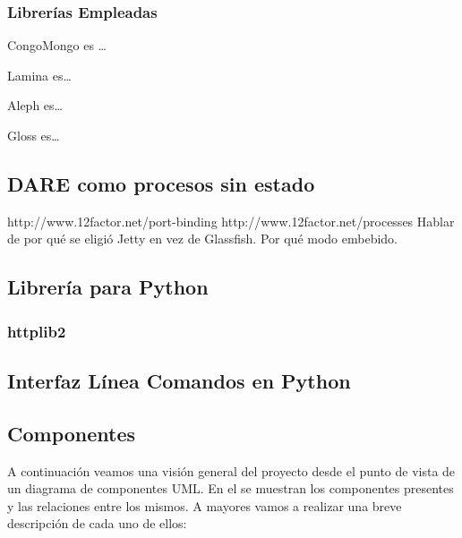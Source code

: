 \subsubsection{Librerías Empleadas}
\begin{description}
\item{CongoMongo} es \ldots{}
\item{Lamina} es\ldots{}
\item{Aleph} es\ldots{}
\item{Gloss} es\ldots{}
\end{description}

\subsection{DARE como procesos sin estado}
http://www.12factor.net/port-binding
http://www.12factor.net/processes
Hablar de por qué se eligió Jetty en vez de Glassfish. Por qué modo
embebido.

\subsection{Librería para Python}
\subsubsection{httplib2}
\subsection{Interfaz Línea Comandos en Python}

\subsection{Componentes}
A continuación veamos una visión general del proyecto desde el punto
de vista de un diagrama de componentes UML. En el se muestran los
componentes presentes y las relaciones entre los mismos. A mayores
vamos a realizar una breve descripción de cada uno de ellos:

